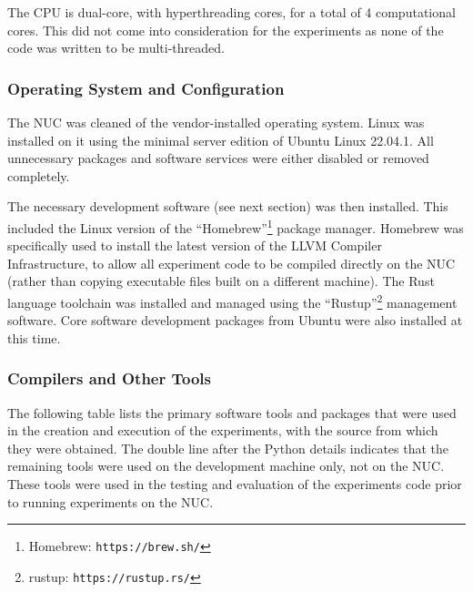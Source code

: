 The CPU is dual-core, with hyperthreading cores, for a total of 4 computational cores. This did not come into consideration for the experiments as none of the code was written to be multi-threaded.

\subsubsection{Operating System and Configuration}

The NUC was cleaned of the vendor-installed operating system. Linux was installed on it using the minimal server edition of Ubuntu Linux 22.04.1. All unnecessary packages and software services were either disabled or removed completely.

The necessary development software (see next section) was then installed. This included the Linux version of the ``Homebrew''\footnote{Homebrew: \texttt{https://brew.sh/}} package manager. Homebrew was specifically used to install the latest version of the LLVM Compiler Infrastructure, to allow all experiment code to be compiled directly on the NUC (rather than copying executable files built on a different machine). The Rust language toolchain was installed and managed using the ``Rustup''\footnote{rustup: \texttt{https://rustup.rs/}} management software. Core software development packages from Ubuntu were also installed at this time.

\subsubsection{Compilers and Other Tools}

The following table lists the primary software tools and packages that were used in the creation and execution of the experiments, with the source from which they were obtained. The double line after the Python details indicates that the remaining tools were used on the development machine only, not on the NUC. These tools were used in the testing and evaluation of the experiments code prior to running experiments on the NUC.

